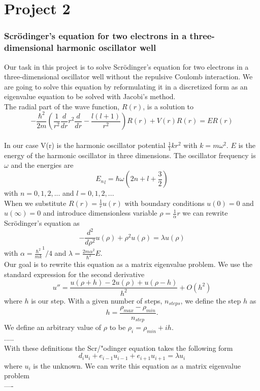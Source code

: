 \documentclass[a4paper,12pt, english]{article}
\begin{document}
\section*{Project 2}
\subsubsection*{Scr\"odinger's equation for two electrons in a three-dimensional harmonic oscillator well }

Our task in this project is to solve Scr\"odinger's equation for two electrons in a three-dimensional oscillator well without the repulsive Coulomb interaction. We are going to solve this equation by reformulating it in a discretized form as an eigenvalue equation to be solved with Jacobi's method. 
\\
The radial part of the wave function, $R(r)$, is a solution to 
$$ -\frac{\hbar^2}{2m}(\frac{1}{r^2}\frac{d}{dr}r^2\frac{d}{dr} - \frac{l(l+1)}{r^2})R(r) + V(r)R(r) = ER(r)  $$
\\
In our case V(r) is the harmonic oscillator potential $\frac{1}{1}kr^2$ with $k=m\omega^2$. $E$ is the energy of the harmonic oscillator in three dimensions. The oscillator frequency is $\omega$ and the energies are
$$ {E_n}_l = \hbar\omega(2n + l + \frac{3}{2}) $$
with $n = 0,1,2,...$ and $l = 0,1,2,...$  \\
When we substitute $R(r) = \frac{1}{r}u(r)$ with boundary conditions $u(0) = 0$ and $u(\infty) = 0$ and introduce dimensionless variable $\rho = \frac{1}{\alpha}r$ we can rewrite Scr\"odinger's equation as 
$$ - \frac{d^2}{d\rho^2}u(\rho) + \rho^2u(\rho) = \lambda u(\rho) $$
with $\alpha = \frac{\hbar^2}{mk}^1/4$ and $\lambda = \frac{2m\alpha^2}{\hbar^2}E$. \\
Our goal is to rewrite this equation as a matrix eigenvalue problem. We use the standard expression for the second derivative $$ u'' = \frac{u(\rho + h) -2u(\rho) + u(\rho -h)}{h^2} + O(h^2) $$
where $h$ is our step.
With a given number of steps, $n_{steps}$, we define the step $h$ as $$h = \frac{\rho_{max}-\rho_{min}}{n_{step}}. $$
We define an arbitrary value of $\rho$ to be $\rho_i = \rho_{min} + ih$. \\
.....\\

With these definitions the Scr/"odinger equation takes the following form $$ d_iu_i + e_{i-1}u_{i-1} + e_{i+1}u_{i+1} = \lambda u_i $$
where $u_i$ is the unknown. We can write this equation as a matrix eigenvalue problem \\
----
\end{document}
